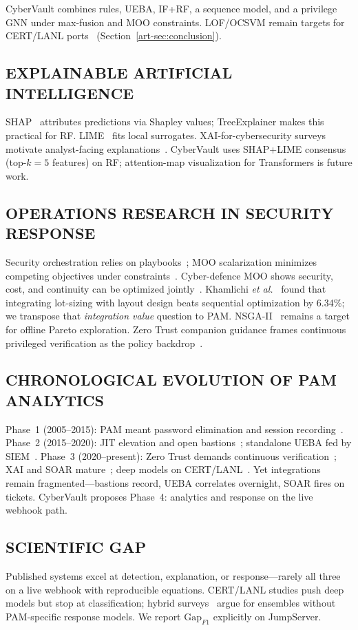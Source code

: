 CyberVault combines rules, UEBA, IF+RF, a sequence model, and a privilege GNN under max-fusion and MOO constraints. LOF/OCSVM remain targets for CERT/LANL ports~\cite{ref43} (Section~\ref{art-sec:conclusion}).

\subsection{EXPLAINABLE ARTIFICIAL INTELLIGENCE}
SHAP~\cite{ref12} attributes predictions via Shapley values; TreeExplainer makes this practical for RF. LIME~\cite{ref13} fits local surrogates. XAI-for-cybersecurity surveys motivate analyst-facing explanations~\cite{ref25,ref46}. CyberVault uses SHAP+LIME consensus (top-$k=5$ features) on RF; attention-map visualization for Transformers is future work.

\subsection{OPERATIONS RESEARCH IN SECURITY RESPONSE}
Security orchestration relies on playbooks~\cite{ref15,ref41}; MOO scalarization minimizes competing objectives under constraints~\cite{ref14,ref33,ref38,ref39}. Cyber-defence MOO shows security, cost, and continuity can be optimized jointly~\cite{ref33,ref34,ref38}. Khamlichi \textit{et al.}~\cite{ref14} found that integrating lot-sizing with layout design beats sequential optimization by 6.34\%; we transpose that \textit{integration value} question to PAM. NSGA-II~\cite{ref35} remains a target for offline Pareto exploration. Zero Trust companion guidance frames continuous privileged verification as the policy backdrop~\cite{ref22,ref47}.

\subsection{CHRONOLOGICAL EVOLUTION OF PAM ANALYTICS}
Phase~1 (2005--2015): PAM meant password elimination and session recording~\cite{ref16,ref17}. Phase~2 (2015--2020): JIT elevation and open bastions~\cite{ref5}; standalone UEBA fed by SIEM~\cite{ref2,ref27}. Phase~3 (2020--present): Zero Trust demands continuous verification~\cite{ref28,ref29}; XAI and SOAR mature~\cite{ref12,ref13,ref15}; deep models on CERT/LANL~\cite{ref10,ref23}. Yet integrations remain fragmented---bastions record, UEBA correlates overnight, SOAR fires on tickets. CyberVault proposes Phase~4: analytics and response on the live webhook path.

\subsection{SCIENTIFIC GAP}
Published systems excel at detection, explanation, or response---rarely all three on a live webhook with reproducible equations. CERT/LANL studies push deep models but stop at classification; hybrid surveys~\cite{ref11,ref24} argue for ensembles without PAM-specific response models. We report $\mathrm{Gap}_{F1}$ explicitly on JumpServer.

